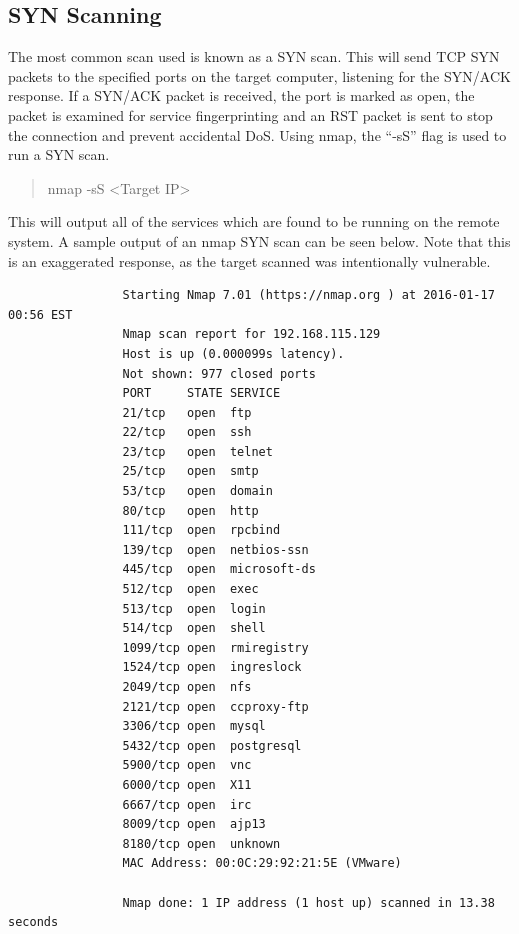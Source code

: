 \documentclass[a4paper,11pt]{report}
\begin{document}
		\subsection{SYN Scanning}
			The most common scan used is known as a SYN scan. 
			This will send TCP SYN packets to the specified ports on the target computer, listening for the SYN/ACK response. 
			If a SYN/ACK packet is received, the port is marked as open, the packet is examined for service fingerprinting and an RST packet is sent to stop the connection and prevent accidental DoS. 
			Using nmap, the ``-sS'' flag is used to run a SYN scan. 
			\begin{quote}
				nmap -sS <Target IP>
			\end{quote}
			This will output all of the services which are found to be running on the remote system. 
			A sample output of an nmap SYN scan can be seen below. 
			Note that this is an exaggerated response, as the target scanned was intentionally vulnerable. 
			\begin{verbatim}
				Starting Nmap 7.01 (https://nmap.org ) at 2016-01-17 00:56 EST
				Nmap scan report for 192.168.115.129
				Host is up (0.000099s latency).
				Not shown: 977 closed ports
				PORT     STATE SERVICE
				21/tcp   open  ftp
				22/tcp   open  ssh
				23/tcp   open  telnet
				25/tcp   open  smtp
				53/tcp   open  domain
				80/tcp   open  http
				111/tcp  open  rpcbind
				139/tcp  open  netbios-ssn
				445/tcp  open  microsoft-ds
				512/tcp  open  exec
				513/tcp  open  login
				514/tcp  open  shell
				1099/tcp open  rmiregistry
				1524/tcp open  ingreslock
				2049/tcp open  nfs
				2121/tcp open  ccproxy-ftp
				3306/tcp open  mysql
				5432/tcp open  postgresql
				5900/tcp open  vnc
				6000/tcp open  X11
				6667/tcp open  irc
				8009/tcp open  ajp13
				8180/tcp open  unknown
				MAC Address: 00:0C:29:92:21:5E (VMware)
	
				Nmap done: 1 IP address (1 host up) scanned in 13.38 seconds
			\end{verbatim}
\end{document}
